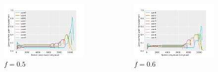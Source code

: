 \documentclass[t]{beamer}  %
\begin{document}
\begin{frame}[fragile]
	\frametitle{\insertsection} 
	\framesubtitle{\insertsubsection}

	\vspace{-0.5cm}
	
	\begin{columns}
		\begin{column}{0.65\linewidth}
			\begin{figure}[H]
				\centering 
					\includegraphics[width=\linewidth]{images/fair_share_05}
					\caption*{$f = 0.5$}
				\end{figure}
		\end{column}
		\hspace{-1cm}
		\begin{column}{0.65\linewidth}
			\begin{figure}[H]
				\centering 
					\includegraphics[width=\linewidth]{images/fair_share_06}
					\caption*{$f = 0.6$}
				\end{figure}
		\end{column}
	\end{columns}


	
\end{frame}
\end{document}
